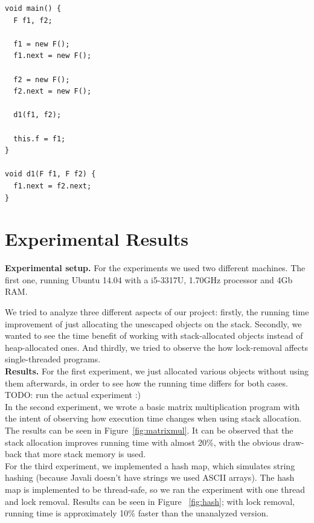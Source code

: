 \documentclass[letterpaper]{article}
\newcommand{\mypar}[1]{{\bf #1.}}
\begin{document}
\begin{lstlisting}[caption=Field parameter assignment, label=lst:fields]
void main() {
  F f1, f2;

  f1 = new F();
  f1.next = new F();

  f2 = new F();
  f2.next = new F();

  d1(f1, f2);

  this.f = f1;
}

void d1(F f1, F f2) {
  f1.next = f2.next;
}
\end{lstlisting}

\section{Experimental Results}\label{sec:exp}


\mypar{Experimental setup} For the experiments we used two different machines. The first one, running
Ubuntu 14.04 with a i5-3317U, 1.70GHz processor and 4Gb RAM.

We tried to analyze three different aspects of our project: firstly, the running time improvement of just allocating
the unescaped objects on the stack. Secondly, we wanted to see the time benefit of working with stack-allocated
objects instead of heap-allocated ones. And thirdly, we tried to observe the how lock-removal affects single-threaded
programs.\\

\mypar{Results}
For the first experiment, we just allocated various objects without using them afterwards, in order to see how the running time differs
for both cases. TODO: run the actual experiment :)\\

In the second experiment, we wrote a basic matrix multiplication program with the intent of observing how execution time changes when using
stack allocation. The results can be seen in Figure~\ref{fig:matrixmul}. It can be observed that the stack allocation improves running
time with almost 20\%, with the obvious draw-back that more stack memory is used.\\

For the third experiment, we implemented a hash map, which simulates string hashing (because Javali doesn't have strings we used ASCII arrays).
The hash map is implemented to be thread-safe, so we ran the experiment with one thread and lock removal. Results can be seen in Figure~
\ref{fig:hash}; with lock removal, running time is approximately 10\% faster than the unanalyzed version.\\
\end{document}

